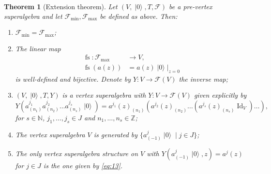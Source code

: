 \documentclass[a4paper, 12pt, reqno]{amsart}
\newtheorem{theorem}{Theorem}[section]
\theoremstyle{remark}
\numberwithin{equation}{subsection}
\DeclareMathOperator{\Id}{Id}
\DeclareMathOperator{\vac}{|0\rangle}
\DeclareMathOperator{\fs}{fs}
\begin{document}
\begin{theorem}[Extension theorem]
  \label{thr:18}
  Let $(V, \vac, T, \mathcal{F})$ be a pre-vertex superalgebra and let $\mathcal{F}_{\min}, \mathcal{F}_{\max}$ be defined as above.
  Then:
  \begin{enumerate}
  \item $\mathcal{F}_{\min} = \mathcal{F}_{\max}$;
  \item The linear map
    \begin{align*}
      \fs: \mathcal{F}_{\max} &\to V, \\
      \fs(a(z)) &= a(z)\vac|_{z = 0}
    \end{align*}
    is well-defined and bijective.
    Denote by $Y: V \to \mathcal{F}(V)$ the inverse map;
  \item $(V, \vac, T, Y)$ is a vertex superalgebra with $Y: V \to \mathcal{F}(V)$ given explicitly by
    \begin{equation}
      \label{eq:13}
      Y(a^{j_1}_{(n_1)}a^{j_2}_{(n_2)}\dots a^{j_s}_{(n_s)}\vac) = a^{j_1}(z)_{(n_1)}(a^{j_2}(z)_{(n_2)}\dots (a^{j_s}(z)_{(n_s)}\Id_V)\dots),
    \end{equation}
    for $s \in \mathbb{N}$, $j_1, \dots, j_s \in J$ and $n_1, \dots, n_s \in \mathbb{Z}$;
  \item The vertex superalgebra $V$ is generated by $\{a^j_{(-1)}\vac \mid j \in J\}$;
  \item The only vertex superalgebra structure on $V$ with $Y(a^j_{(-1)}\vac, z) = a^j(z)$ for $j \in J$ is the one given by \eqref{eq:13}.
  \end{enumerate}
\end{theorem}
\end{document}
